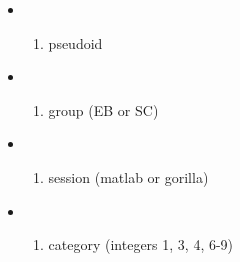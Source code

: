 \documentclass[
]{article}
\providecommand{\tightlist}{%
  \setlength{\itemsep}{0pt}\setlength{\parskip}{0pt}}
\begin{document}
\begin{itemize}
\item
  \begin{enumerate}
  \def\labelenumi{\arabic{enumi}.}
  \tightlist
  \item
    pseudoid
  \end{enumerate}
\item
  \begin{enumerate}
  \def\labelenumi{\arabic{enumi}.}
  \setcounter{enumi}{1}
  \tightlist
  \item
    group (EB or SC)
  \end{enumerate}
\item
  \begin{enumerate}
  \def\labelenumi{\arabic{enumi}.}
  \setcounter{enumi}{2}
  \tightlist
  \item
    session (matlab or gorilla)
  \end{enumerate}
\item
  \begin{enumerate}
  \def\labelenumi{\arabic{enumi}.}
  \setcounter{enumi}{3}
  \tightlist
  \item
    category (integers 1, 3, 4, 6-9)
  \end{enumerate}


\end{itemize}
\end{document}
